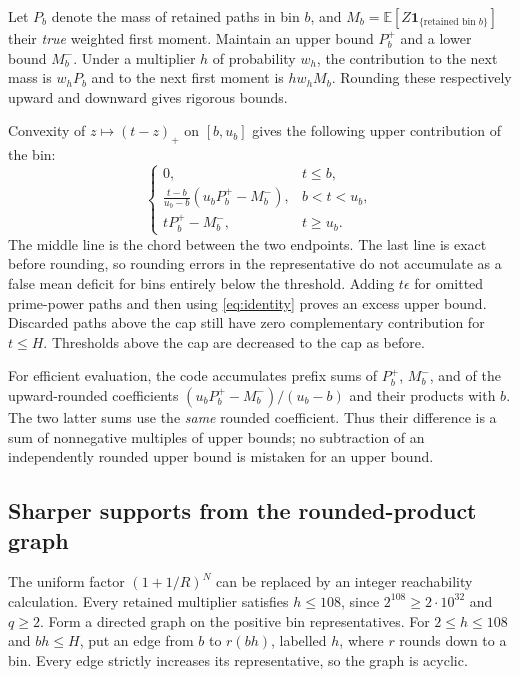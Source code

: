 \documentclass[11pt]{article}
\newcommand{\E}{\mathbb E}
\begin{document}
Let $P_b$ denote the mass of retained paths in bin $b$, and
$M_b=\E[Z\mathbf1_{\{\text{retained bin }b\}}]$ their \emph{true}
weighted first moment. Maintain an upper bound $P_b^+$ and a lower bound
$M_b^-$. Under a multiplier $h$ of probability $w_h$, the contribution
to the next mass is $w_hP_b$ and to the next first moment is $hw_hM_b$.
Rounding these respectively upward and downward gives rigorous bounds.

Convexity of $z\mapsto(t-z)_+$ on $[b,u_b]$ gives the following upper
contribution of the bin:
\[
 \begin{cases}
 0,&t\leq b,\\
 \displaystyle\frac{t-b}{u_b-b}(u_bP_b^+-M_b^-),&b<t<u_b,\\
 tP_b^+-M_b^-,&t\geq u_b.
 \end{cases}
\]
The middle line is the chord between the two endpoints. The last line is
exact before rounding, so rounding errors in the representative do not
accumulate as a false mean deficit for bins entirely below the threshold.
Adding $t\epsilon$ for omitted prime-power paths and then using
\eqref{eq:identity} proves an excess upper bound. Discarded paths above
the cap still have zero complementary contribution for $t\leq H$.
Thresholds above the cap are decreased to the cap as before.

For efficient evaluation, the code accumulates prefix sums of $P_b^+$,
$M_b^-$, and of the upward-rounded coefficients
$(u_bP_b^+-M_b^-)/(u_b-b)$ and their products with $b$.
The two latter sums use the \emph{same} rounded coefficient. Thus their
difference is a sum of nonnegative multiples of upper bounds; no subtraction
of an independently rounded upper bound is mistaken for an upper bound.

\subsection{Sharper supports from the rounded-product graph}\label{sec:reachable}
The uniform factor $(1+1/R)^N$ can be replaced by an integer reachability
calculation. Every retained multiplier satisfies $h\leq108$, since
$2^{108}\geq2\cdot10^{32}$ and $q\geq2$. Form a directed graph on the
positive bin representatives. For $2\leq h\leq108$ and $bh\leq H$, put an
edge from $b$ to $r(bh)$, labelled $h$, where $r$ rounds down to a bin.
Every edge strictly increases its representative, so the graph is acyclic.
\end{document}
